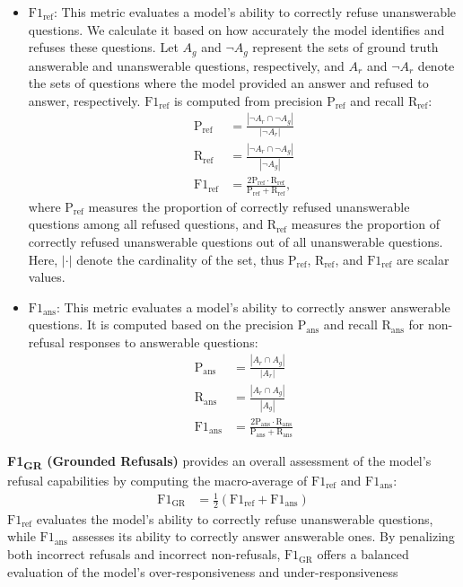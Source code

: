 \documentclass{article} %
\begin{document}
\begin{itemize}
\item \textbf{$\text{F1}_{\text{ref}}$}: This metric evaluates a model's ability to correctly refuse unanswerable questions. We calculate it based on how accurately the model identifies and refuses these questions. Let \(A_g\) and \(\neg A_g\) represent the sets of ground truth answerable and unanswerable questions, respectively, and \(A_r\) and \(\neg A_r\) denote the sets of questions where the model provided an answer and refused to answer, respectively. $\text{F1}_{\text{ref}}$ is computed from precision $\text{P}_{\text{ref}}$ and recall $\text{R}_{\text{ref}}$:
%
\begin{align}
    \text{P}_{\text{ref}} &= \frac{|\neg A_r \cap \neg A_g|}{|\neg A_r|}\\
    \text{R}_{\text{ref}} &= \frac{|\neg A_r \cap \neg A_g|}{|\neg A_g|}\\
    \text{F1}_{\text{ref}} &= \frac{\text{2P}_{\text{ref}}\cdot \text{R}_{\text{ref}}}{\text{P}_{\text{ref}} + \text{R}_{\text{ref}}},
\end{align}
%
where $\text{P}_{\text{ref}}$ measures the proportion of correctly refused unanswerable questions among all refused questions, and $\text{R}_{\text{ref}}$ measures the proportion of correctly refused unanswerable questions out of all unanswerable questions. Here, $|\cdot|$ denote the cardinality of the set, thus $\text{P}_{\text{ref}}$, $\text{R}_{\text{ref}}$, and $\text{F1}_{\text{ref}}$ are scalar values.

\item \textbf{$\text{F1}_{\text{ans}}$}: This metric evaluates a model's ability to correctly answer answerable questions. It is computed based on the precision $\text{P}_{\text{ans}}$ and recall $\text{R}_{\text{ans}}$ for non-refusal responses to answerable questions:
%
\begin{align}
    \text{P}_{\text{ans}} &= \frac{|A_r \cap A_g|}{|A_r|}\\
    \text{R}_{\text{ans}} &= \frac{|A_r \cap A_g|}{|A_g|}\\
    \text{F1}_{\text{ans}} &= \frac{2\text{P}_{\text{ans}} \cdot \text{R}_{\text{ans}}}{\text{P}_{\text{ans}} + \text{R}_{\text{ans}}}
\end{align}
%
\end{itemize}

\textbf{F1{\textsubscript{GR}} (Grounded Refusals)} provides an overall assessment of the model's refusal capabilities by computing the macro-average of $\text{F1}_{\text{ref}}$ and $\text{F1}_{\text{ans}}$:
\begin{align}
    \text{F1}_{\text{GR}} &= \frac{1}{2}(\text{F1}_{\text{ref}} + \text{F1}_{\text{ans}})
\end{align}
$\text{F1}_{\text{ref}}$ evaluates the model’s ability to correctly refuse unanswerable questions, while $\text{F1}_{\text{ans}}$ assesses its ability to correctly answer answerable ones. By penalizing both incorrect refusals and incorrect non-refusals, $\text{F1}_{\text{GR}}$ offers a balanced evaluation of the model’s over-responsiveness and under-responsiveness
\end{document}
